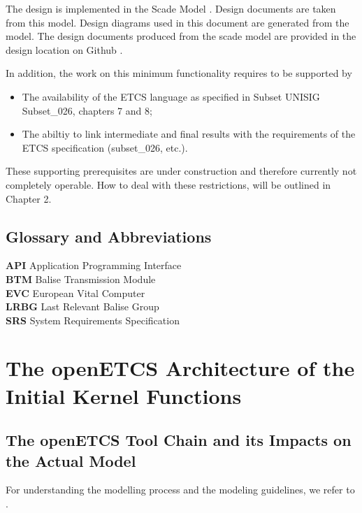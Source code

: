 \documentclass{template/openetcs_report}
\begin{document}
The design is implemented in the Scade Model \cite{scade-model}. Design documents are taken from this model. Design diagrams used in this document are generated from the model. The design documents produced from the scade model are provided in the design location on Github \cite{designFI}.

In addition, the work on this minimum functionality requires to be supported by
\begin{itemize}
	\item The availability of the ETCS language as specified in Subset UNISIG Subset\_026, chapters 7 and 8;
	\item The abiltiy to link intermediate and final results with the requirements of the ETCS specification (subset\_026, etc.). 
\end{itemize}
These supporting prerequisites are under construction and therefore currently not completely operable. How to deal with these restrictions, will be outlined in Chapter 2.

\section{Glossary and Abbreviations}

\textbf{API} Application Programming Interface\\
\textbf{BTM} Balise Transmission Module\\
\textbf{EVC} European Vital Computer\\
\textbf{LRBG} Last Relevant Balise Group\\
\textbf{SRS} System Requirements Specification\\


\chapter{The openETCS Architecture of the Initial Kernel Functions}

\section{The openETCS Tool Chain and its Impacts on the Actual Model}

For understanding the modelling process and the modeling guidelines, we refer to \cite{wp3-dow}. 
\end{document}
